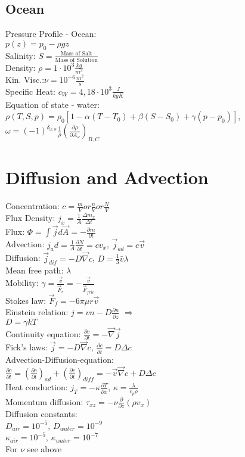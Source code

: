 \subsection*{Ocean}
Pressure Profile - Ocean:\\
$p(z)=p_0-\rho g z$\\
Salinity: $S=\frac{\text{Mass of Salt}}{\text{Mass of Solution}}$\\
Density: $\rho=1\cdot10^3\frac{kg}{m^3}$\\
Kin. Visc.:$\nu=10^{-6}\frac{m^2}{s}$\\
Specific Heat: $c_W=4,18\cdot10^3\frac{J}{kgK}$\\
Equation of state - water:\\
$\rho(T,S,p)=\rho_0[1-\alpha(T-T_0)+\beta(S-S_0)+\gamma(p-p_0)]$, $\omega=(-1)^{\delta_{\omega,\alpha}}\frac{1}{\rho}\left(\frac{\partial \rho}{\partial A_\omega}\right)_{B,C}$
\section*{Diffusion and Advection}
Concentration: $c=\frac{m}{V} or \frac{n}{V} or \frac{N}{V}$\\
Flux Density: $j_x=\frac{1}{A}\frac{\Delta m_x}{\Delta t}$\\
Flux: $\Phi=\int\vec{j}d\vec{A}=-\frac{\partial m}{\partial t}$\\
Advection: $j_ad = \frac{1}{A}\frac{\partial N}{\partial t}=cv_x$, $\vec{j}_{ad}=c\vec{v}$\\
Diffusion: $\vec{j}_{dif}=-D\vec{\nabla} c$, $D=\frac{1}{3}\bar{v}\lambda$\\
Mean free path: $\lambda$\\
Mobility: $\gamma = \frac{\vec{v}}{\vec{F}_e}=-\frac{\vec{v}}{\vec{F}_{fric}}$\\
Stokes law: $\vec{F}_f=-6\pi\mu r\vec{v}$\\
Einstein relation: $j=vn-D\frac{\partial n}{\partial z}$ $\Rightarrow$\\ $D=\gamma kT$\\
Continuity equation: $\frac{\partial c}{\partial t}=-\vec{\nabla}\vec{j}$\\
Fick's laws: $\vec{j}=-D\vec{\nabla}c$, $\frac{\partial c}{\partial t} = D\Delta c$\\
Advection-Diffusion-equation:\\
$\frac{\partial c}{\partial t}=\left(\frac{\partial c}{\partial t}\right)_{ad}+\left(\frac{\partial c}{\partial t}\right)_{diff}=-\vec{v}\vec{\nabla}c+D\Delta c$\\
Heat conduction: $j_T = -\kappa\frac{\partial T}{\partial x}$, $\kappa = \frac{\lambda}{c_p\rho}$\\
Momentum diffusion: $\tau_{xz}=-\nu\frac{\partial}{\partial z}(\rho v_x)$\\
Diffusion constants:\\
$D_{air}=10^{-5}$, $D_{water}=10^{-9}$\\
$\kappa_{air}=10^{-5}$, $\kappa_{water}=10^{-7}$\\
For $\nu$ see above
